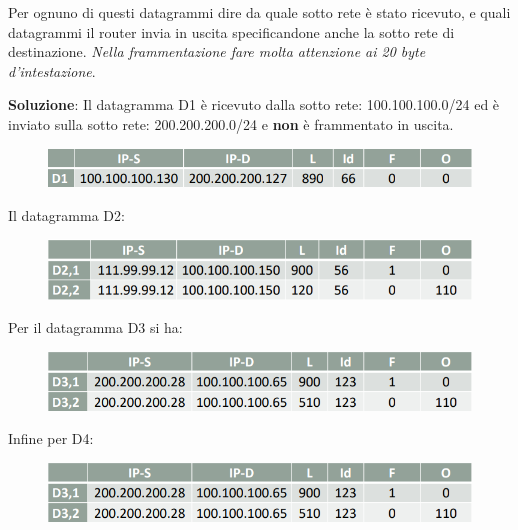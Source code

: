 \documentclass[11pt,a4paper,oneside]{book}
\theoremstyle{definition}
\begin{document}
\begin{enumerate}
	      Per ognuno di questi datagrammi dire da quale sotto rete è stato ricevuto, e
	      quali datagrammi il router invia in uscita specificandone anche la sotto rete di
	      destinazione. \textit{Nella frammentazione fare molta attenzione ai 20 byte d'intestazione}.


	      \textbf{Soluzione}:
	      Il datagramma D1 è ricevuto dalla sotto rete: 100.100.100.0/24 ed è inviato sulla sotto rete: 200.200.200.0/24 e \textbf{non} è frammentato in uscita.

	      \begin{figure}[!h]
		      \includegraphics[scale=0.4]{Immagini/Ip_es2_1.png}
		      \centering
	      \end{figure}

	      Il datagramma D2:

	      \begin{figure}[!h]
		      \includegraphics[scale=0.4]{Immagini/Ip_es2_2.png}
		      \centering
	      \end{figure}

	      Per il datagramma D3 si ha:

	      \begin{figure}[!h]
		      \includegraphics[scale=0.4]{Immagini/Ip_es2_3.png}
		      \centering
	      \end{figure}

	      Infine per D4:

	      \begin{figure}[!h]
		      \includegraphics[scale=0.4]{Immagini/Ip_es2_3.png}
		      \centering
	      \end{figure}
\end{enumerate}

\pagebreak
\end{document}
